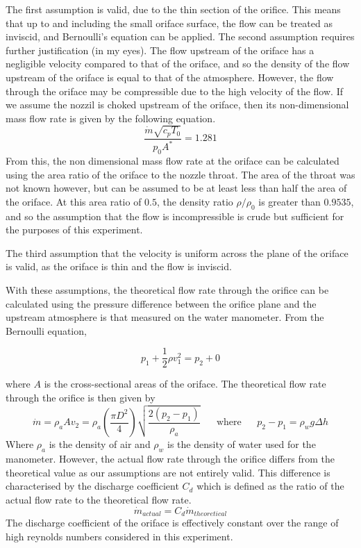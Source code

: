 \documentclass[8pt]{article}
\begin{document}
The first assumption is valid, due to the thin section of the orifice. This means that up to and including the small oriface surface, the flow can be treated as inviscid, and Bernoulli's equation can be applied.
The second assumption requires further justification (in my eyes). The flow upstream of the oriface has a negligible velocity compared to that of the oriface, and so the density of the flow upstream of the oriface is equal to that of the atmosphere.
However, the flow through the oriface may be compressible due to the high velocity of the flow.
If we assume the nozzil is choked upstream of the oriface, then its non-dimensional mass flow rate is given by the following equation.
\begin{equation}
    \frac{\dot{m}\sqrt{c_pT_0}}{p_0A^*} = 1.281
\end{equation}
From this, the non dimensional mass flow rate at the oriface can be calculated using the area ratio of the oriface to the nozzle throat.
The area of the throat was not known however, but can be assumed to be at least less than half the area of the oriface.
At this area ratio of $0.5$, the density ratio $\rho/\rho_0$ is greater than $0.9535$, and so the assumption that the flow is incompressible is crude but sufficient for the purposes of this experiment.

\newpage


The third assumption that the velocity is uniform across the plane of the oriface is valid, as the oriface is thin and the flow is inviscid.

With these assumptions, the theoretical flow rate through the orifice can be calculated using the pressure difference between the orifice plane and the upstream atmosphere is that measured on the
water manometer. From the Bernoulli equation,

\begin{equation}
    p_1 + \frac{1}{2} \rho v_1^2 = p_2 + 0
\end{equation}

where $A$ is the cross-sectional areas of the oriface. The theoretical flow rate through the orifice is then given by
\begin{equation}
    \dot{m} = \rho_a A v_2 = \rho_a \left( \frac{\pi D^2}{4}\right) \sqrt{\frac{2(p_2-p_1)}{\rho_a}} \;\;\;\;\;\; \text{where} \;\;\;\;\;\ p_2 - p_1 = \rho_w g \Delta h
\end{equation}
Where $\rho_a$ is the density of air and $\rho_w$ is the density of water used for the manometer.
However, the actual flow rate through the orifice differs from the theoretical value as our assumptions are not entirely valid.
This difference is characterised by the discharge coefficient $C_d$ which is defined as the ratio of the actual flow rate to the theoretical flow rate.
\begin{equation}
    \dot{m}_{actual} = C_d \dot{m}_{theoretical}
\end{equation}
The discharge coefficient of the oriface is effectively constant over the range of high reynolds numbers considered in this experiment. 
\end{document}
